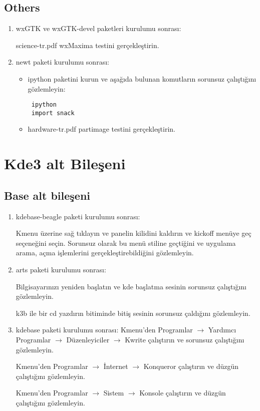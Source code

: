 \documentclass[a4paper,10pt]{article}
\begin{document}
\subsection*{Others}
\begin{enumerate}
\item wxGTK ve wxGTK-devel paketleri kurulumu sonrası:

science-tr.pdf wxMaxima testini gerçekleştirin.

 \item newt paketi kurulumu sonrası:
\begin{itemize}
 \item ipython paketini kurun ve aşağıda bulunan komutların sorunsuz çalıştığını gözlemleyin:
\begin{verbatim}
 ipython
 import snack
\end{verbatim}
  \item hardware-tr.pdf partimage testini gerçekleştirin.

\end{itemize}
 


\end{enumerate}

\section{Kde3 alt Bileşeni}
\subsection*{Base alt bileşeni}
\begin{enumerate}
\item kdebase-beagle paketi kurulumu sonrası:

Kmenu üzerine sağ tıklayın ve panelin kilidini kaldırın ve kickoff menüye geç seçeneğini seçin. Sorunsuz olarak bu menü stiline geçtiğini ve uygulama arama, açma işlemlerini gerçekleştirebildiğini gözlemleyin.

\item arts paketi kurulumu sonrası:

Bilgisayarınızı yeniden başlatın ve kde başlatma sesinin sorunsuz çalıştığını gözlemleyin.

k3b ile bir cd yazdırın bitiminde bitiş sesinin sorunsuz çaldığını gözlemleyin.

 \item kdebase paketi kurulumu sonrası:
Kmenu'den Programlar $\rightarrow$ Yardımcı Programlar $\rightarrow$ Düzenleyiciler $\rightarrow$ Kwrite çalıştırın ve sorunsuz çalıştığını gözlemleyin.

Kmenu'den Programlar $\rightarrow$ İnternet $\rightarrow$ Konqueror çalıştırın ve düzgün çalıştığını gözlemleyin.

Kmenu'den Programlar $\rightarrow$ Sistem $\rightarrow$ Konsole çalıştırın ve düzgün çalıştığını gözlemleyin.

\end{enumerate}
\end{document}
